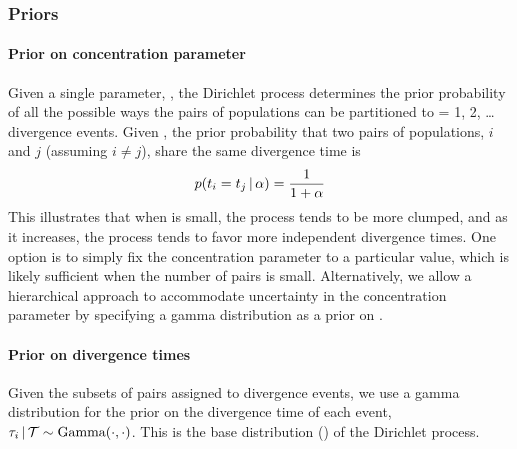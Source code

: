 \subsubsection{Priors}


\paragraph{Prior on concentration parameter}
Given a single parameter, \concentration, the Dirichlet process determines the
prior probability of all the possible ways the \ncomparisons pairs of
populations can be partitioned to \nevents = 1, 2, \ldots \ncomparisons
divergence events.
Given \concentration, the prior probability that two pairs of populations, $i$
and $j$ (assuming $i \neq j$), share the same divergence time is
\begin{equation}
    \pr(\comparisondivtime[i] = \comparisondivtime[j] \given \concentration)
    =
    \frac{1}{1 + \concentration}
\end{equation}
This illustrates that when \concentration is small, the process tends to be
more clumped, and as it increases, the process tends to favor more independent
divergence times.
One option is to simply fix the concentration parameter to a particular value,
which is likely sufficient when the number of pairs is small.
Alternatively, we allow a hierarchical approach to accommodate uncertainty in
the concentration parameter by specifying a gamma distribution as a prior on
\concentration \citep{Escobar1995,Heath2011}.

\paragraph{Prior on divergence times}
Given the subsets of pairs assigned to divergence events, we use a gamma
distribution for the prior on the divergence time of each event,
$\divtime[i] \given \divtimesets \sim \distgamma(\cdot, \cdot)$.
This is the base distribution (\basedistribution) of the Dirichlet process.

